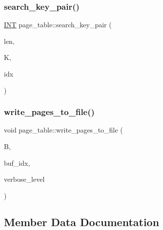 \subsubsection{\texorpdfstring{search\+\_\+key\+\_\+pair()}{search\_key\_pair()}}
{\footnotesize\ttfamily \mbox{\hyperlink{galois_8h_a09fddde158a3a20bd2dcadb609de11dc}{I\+NT}} page\+\_\+table\+::search\+\_\+key\+\_\+pair (\begin{DoxyParamCaption}\item[{\mbox{\hyperlink{galois_8h_a09fddde158a3a20bd2dcadb609de11dc}{I\+NT}}}]{len,  }\item[{\mbox{\hyperlink{structbtree__page__registry__key__pair}{btree\+\_\+page\+\_\+registry\+\_\+key\+\_\+pair}} $\ast$}]{K,  }\item[{\mbox{\hyperlink{galois_8h_a09fddde158a3a20bd2dcadb609de11dc}{I\+NT}} \&}]{idx }\end{DoxyParamCaption})}

\mbox{\label{classpage__table_a5057f7a8f18b9aec4d4ac739ed18605e}} 
\subsubsection{\texorpdfstring{write\+\_\+pages\+\_\+to\+\_\+file()}{write\_pages\_to\_file()}}
{\footnotesize\ttfamily void page\+\_\+table\+::write\+\_\+pages\+\_\+to\+\_\+file (\begin{DoxyParamCaption}\item[{\mbox{\hyperlink{classbtree}{btree}} $\ast$}]{B,  }\item[{\mbox{\hyperlink{galois_8h_a09fddde158a3a20bd2dcadb609de11dc}{I\+NT}}}]{buf\+\_\+idx,  }\item[{\mbox{\hyperlink{galois_8h_a09fddde158a3a20bd2dcadb609de11dc}{I\+NT}}}]{verbose\+\_\+level }\end{DoxyParamCaption})}



\subsection{Member Data Documentation}
\mbox{\label{classpage__table_aa0857ba1382a46b2628ba9f1ec216920}} 
